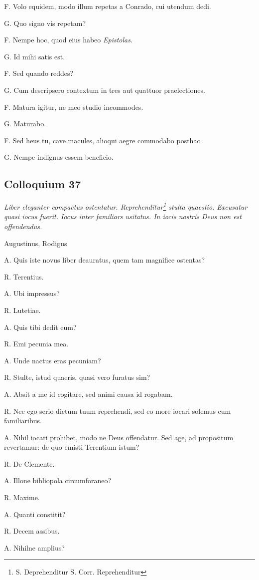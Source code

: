 \documentclass{article}
\begin{document}
F. Volo equidem, modo illum repetas a Conrado, cui utendum dedi.

G. Quo signo vis repetam?

F. Nempe hoc, quod eius habeo \emph{Epistolas}.

G. Id mihi satis est.

F. Sed quando reddes?

G. Cum descripsero contextum in tres aut quattuor praelectiones.

F. Matura igitur, ne meo studio incommodes.

G. Maturabo.

F. Sed heus tu, cave macules, alioqui aegre commodabo posthac.

G. Nempe indignus essem beneficio.

\subsection{Colloquium 37}
\emph{Liber eleganter compactus ostentatur. Reprehenditur\footnote{S. Deprehenditur S. Corr. Reprehenditur} stulta quaestio. Excusatur quasi iocus fuerit. Iocus inter familiars usitatus. In iocis nostris Deus non est offendendus.}

Augustinus, Rodigus

A. Quis iste novus liber deauratus, quem tam magnifice ostentas?

R. Terentius.

A. Ubi impressus?

R. Lutetiae.

A. Quis tibi dedit eum?

R. Emi pecunia mea.

A. Unde nactus eras pecuniam?

R. Stulte, istud quaeris, quasi vero furatus sim?

A. Absit a me id cogitare, sed animi causa id rogabam.

R. Nec ego serio dictum tuum reprehendi, sed eo more iocari solemus cum familiaribus.

A. Nihil iocari prohibet, modo ne Deus offendatur. Sed age, ad propositum revertamur: de quo emisti Terentium istum?

R. De Clemente.

A. Illone bibliopola circumforaneo?

R. Maxime.

A. Quanti constitit?

R. Decem assibus.

A. Nihilne amplius?
\end{document}
